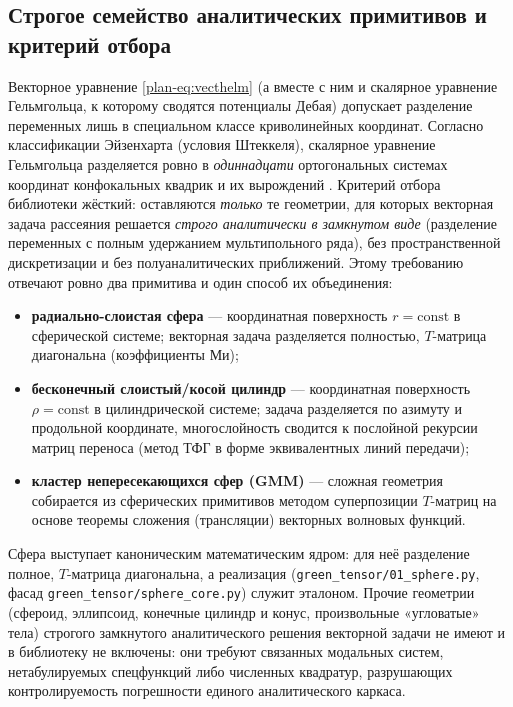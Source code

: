 \documentclass[11pt,a4paper]{article}
\begin{document}
\subsection{Строгое семейство аналитических примитивов и критерий отбора}

Векторное уравнение \eqref{plan-eq:vecthelm} (а вместе с ним и скалярное уравнение Гельмгольца, к которому сводятся потенциалы Дебая) допускает разделение переменных лишь в специальном классе криволинейных координат. Согласно классификации Эйзенхарта (условия Штеккеля), скалярное уравнение Гельмгольца разделяется ровно в \emph{одиннадцати} ортогональных системах координат конфокальных квадрик и их вырождений \cite{eisenhart1934}. Критерий отбора библиотеки жёсткий: оставляются \emph{только} те геометрии, для которых векторная задача рассеяния решается \emph{строго аналитически в замкнутом виде} (разделение переменных с полным удержанием мультипольного ряда), без пространственной дискретизации и без полуаналитических приближений. Этому требованию отвечают ровно два примитива и один способ их объединения:
\begin{itemize}
  \item \textbf{радиально-слоистая сфера} --- координатная поверхность $r=\mathrm{const}$ в сферической системе; векторная задача разделяется полностью, $T$-матрица диагональна (коэффициенты Ми);
  \item \textbf{бесконечный слоистый/косой цилиндр} --- координатная поверхность $\rho=\mathrm{const}$ в цилиндрической системе; задача разделяется по азимуту и продольной координате, многослойность сводится к послойной рекурсии матриц переноса (метод ТФГ в форме эквивалентных линий передачи);
  \item \textbf{кластер непересекающихся сфер (GMM)} --- сложная геометрия собирается из сферических примитивов методом суперпозиции $T$-матриц на основе теоремы сложения (трансляции) векторных волновых функций.
\end{itemize}
Сфера выступает каноническим математическим ядром: для неё разделение полное, $T$-матрица диагональна, а реализация (\texttt{green\_tensor/01\_sphere.py}, фасад \texttt{green\_tensor/sphere\_core.py}) служит эталоном. Прочие геометрии (сфероид, эллипсоид, конечные цилиндр и конус, произвольные «угловатые» тела) строгого замкнутого аналитического решения векторной задачи не имеют и в библиотеку не включены: они требуют связанных модальных систем, нетабулируемых спецфункций либо численных квадратур, разрушающих контролируемость погрешности единого аналитического каркаса.
\end{document}
